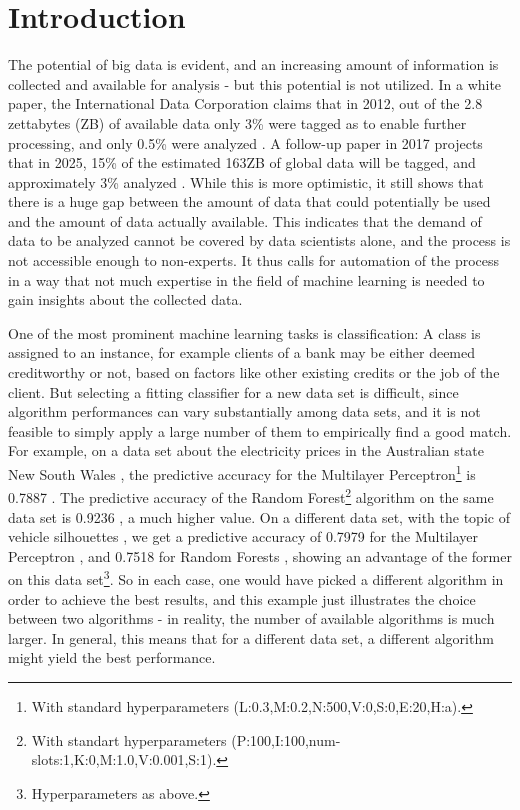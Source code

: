 \chapter{Introduction}
\label{sec:intro}

The potential of big data is evident, and an increasing amount of information is collected and available for analysis - but this potential is not utilized. In a white paper, the International Data Corporation claims that in 2012, out of the 2.8 zettabytes (ZB) of available data only 3\% were tagged as to enable further processing, and only 0.5\% were analyzed \cite{gantz2012the}. A follow-up paper in 2017 projects that in 2025, 15\% of the estimated 163ZB of global data will be tagged, and approximately 3\% analyzed \cite{gantz2017data}. While this is more optimistic, it still shows that there is a huge gap between the amount of data that could potentially be used and the amount of data actually available. This indicates that the demand of data to be analyzed cannot be covered by data scientists alone, and the process is not accessible enough to non-experts. It thus calls for automation of the process in a way that not much expertise in the field of machine learning is needed to gain insights about the collected data.

One of the most prominent machine learning tasks is classification: A class is assigned to an instance, for example clients of a bank may be either deemed creditworthy or not, based on factors like other existing credits or the job of the client. But selecting a fitting classifier for a new data set is difficult, since algorithm performances can vary substantially among data sets, and it is not feasible to simply apply a large number of them to empirically find a good match. For example, on a data set about the electricity prices in the Australian state New South Wales \cite{harris1999splice}, the predictive accuracy for the Multilayer Perceptron\footnote{With standard hyperparameters (L:0.3,M:0.2,N:500,V:0,S:0,E:20,H:a).} is 0.7887 \cite{cachada2017run3}. The predictive accuracy of the Random Forest\footnote{With standart hyperparameters (P:100,I:100,num-slots:1,K:0,M:1.0,V:0.001,S:1).} algorithm on the same data set is 0.9236 \cite{cachada2017run}, a much higher value. On a different data set, with the topic of vehicle silhouettes \cite{siebert1987vehicle}, we get a predictive accuracy of 0.7979 for the Multilayer Perceptron \cite{cachada2017run4}, and 0.7518 for Random Forests \cite{cachada2017run2}, showing an advantage of the former on this data set\footnote{Hyperparameters as above.}. So in each case, one would have picked a different algorithm in order to achieve the best results, and this example just illustrates the choice between two algorithms - in reality, the number of available algorithms is much larger. In general, this means that for a different data set, a different algorithm might yield the best performance.

